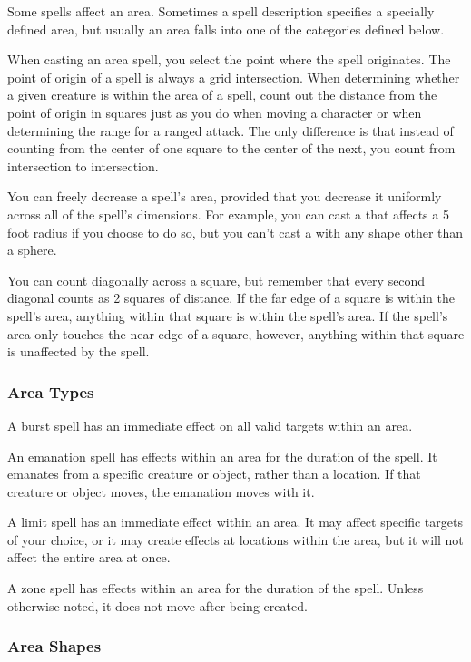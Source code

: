 Some spells affect an area. Sometimes a spell description specifies a specially defined area, but usually an area falls into one of the categories defined below.

When casting an area spell, you select the point where the spell originates. The point of origin of a spell is always a grid intersection. When determining whether a given creature is within the area of a spell, count out the distance from the point of origin in squares just as you do when moving a character or when determining the range for a ranged attack. The only difference is that instead of counting from the center of one square to the center of the next, you count from intersection to intersection.

You can freely decrease a spell's area, provided that you decrease it uniformly across all of the spell's dimensions. For example, you can cast a  that affects a 5 foot radius if you choose to do so, but you can't cast a  with any shape other than a sphere.

You can count diagonally across a square, but remember that every second diagonal counts as 2 squares of distance. If the far edge of a square is within the spell's area, anything within that square is within the spell's area. If the spell's area only touches the near edge of a square, however, anything within that square is unaffected by the spell.

\subsubsection{Area Types}

 A burst spell has an immediate effect on all valid targets within an area.

 An emanation spell has effects within an area for the duration of the spell. It emanates from a specific creature or object, rather than a location. If that creature or object moves, the emanation moves with it.

 A limit spell has an immediate effect within an area. It may affect specific targets of your choice, or it may create effects at locations within the area, but it will not affect the entire area at once.

 A zone spell has effects within an area for the duration of the spell. Unless otherwise noted, it does not move after being created.

\subsubsection{Area Shapes}

